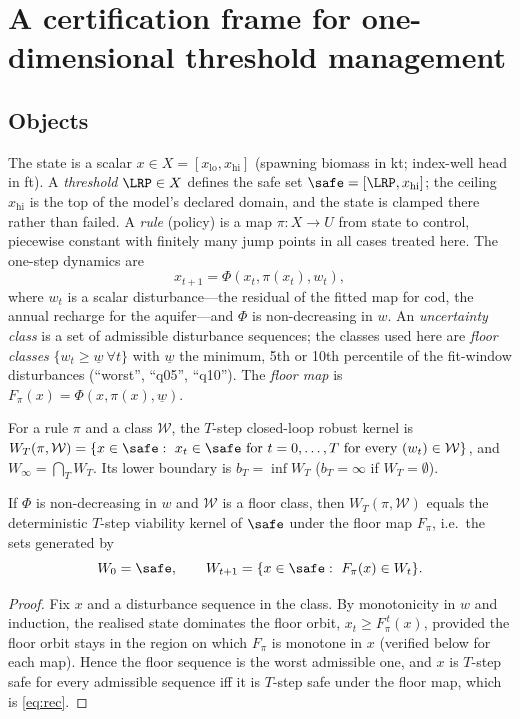 \section{A certification frame for one-dimensional threshold management}\label{sec:frame}

\subsection{Objects}\label{sec:objects}

The state is a scalar $x\in X=[x_{\mathrm{lo}},x_{\mathrm{hi}}]$ (spawning biomass in kt; index-well head in ft). A \emph{threshold} $\LRP\in X$ defines the safe set $\safe=[\LRP,x_{\mathrm{hi}}]$; the ceiling $x_{\mathrm{hi}}$ is the top of the model's declared domain, and the state is clamped there rather than failed. A \emph{rule} (policy) is a map $\pi:X\to U$ from state to control, piecewise constant with finitely many jump points in all cases treated here. The one-step dynamics are
\begin{equation}\label{eq:dyn}
x_{t+1}=\Phi(x_t,\pi(x_t),w_t),
\end{equation}
where $w_t$ is a scalar disturbance---the residual of the fitted map for cod, the annual recharge for the aquifer---and $\Phi$ is non-decreasing in $w$. An \emph{uncertainty class} is a set of admissible disturbance sequences; the classes used here are \emph{floor classes} $\{w_t\ge \underline w\ \forall t\}$ with $\underline w$ the minimum, 5th or 10th percentile of the fit-window disturbances (``worst'', ``q05'', ``q10''). The \emph{floor map} is $F_\pi(x)=\Phi(x,\pi(x),\underline w)$.

\begin{definition}\label{def:kernel}
For a rule $\pi$ and a class $\mathcal W$, the $T$-step closed-loop robust kernel is
$W_T(\pi,\mathcal W)=\{x\in\safe:\ x_t\in\safe\ \text{for } t=0,\dots,T \text{ for every } (w_t)\in\mathcal W\}$, and $W_\infty=\bigcap_T W_T$. Its lower boundary is $b_T=\inf W_T$ ($b_T=\infty$ if $W_T=\emptyset$).
\end{definition}

\begin{lemma}\label{lem:floor}
If $\Phi$ is non-decreasing in $w$ and $\mathcal W$ is a floor class, then $W_T(\pi,\mathcal W)$ equals the deterministic $T$-step viability kernel of $\safe$ under the floor map $F_\pi$, i.e.\ the sets generated by
\begin{equation}\label{eq:rec}
W_0=\safe,\qquad W_{t+1}=\{x\in\safe:\ F_\pi(x)\in W_t\}.
\end{equation}
\end{lemma}
\begin{proof}
Fix $x$ and a disturbance sequence in the class. By monotonicity in $w$ and induction, the realised state dominates the floor orbit, $x_t\ge F_\pi^{\,t}(x)$, provided the floor orbit stays in the region on which $F_\pi$ is monotone in $x$ (verified below for each map). Hence the floor sequence is the worst admissible one, and $x$ is $T$-step safe for every admissible sequence iff it is $T$-step safe under the floor map, which is \eqref{eq:rec}.
\end{proof}

